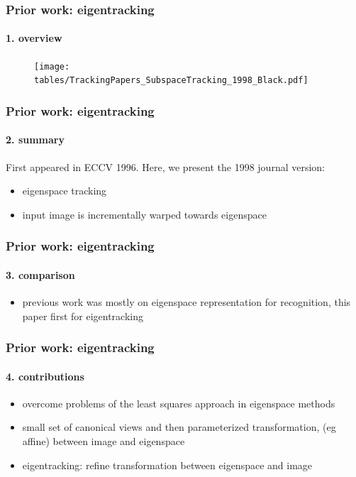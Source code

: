 \begin{frame}
\frametitle{Prior work: eigentracking}
\framesubtitle{1. overview}
\logoCSIPCPL\mypagenum
	\begin{figure}
		\texttt{[image: tables/TrackingPapers\_SubspaceTracking\_1998\_Black.pdf]}
	\end{figure}
\end{frame}



\begin{frame}
\frametitle{Prior work: eigentracking}
\framesubtitle{2. summary}
\logoCSIPCPL\mypagenum
	First appeared in ECCV 1996.  Here, we present the 1998 journal version:\\
	\begin{itemize}
		\item eigenspace tracking			
		\item input image is incrementally warped towards
eigenspace
	\end{itemize}
\end{frame}


\begin{frame}
\frametitle{Prior work: eigentracking}
\framesubtitle{3. comparison}
\logoCSIPCPL\mypagenum		
	\begin{itemize}
		\item previous work was mostly on eigenspace representation for recognition, this paper first for eigentracking
	\end{itemize}
\end{frame}



\begin{frame}
\frametitle{Prior work: eigentracking}
\framesubtitle{4. contributions}
\logoCSIPCPL\mypagenum
	\begin{itemize}
		\item overcome problems of the least squares approach in eigenspace methods
		\item small set of canonical views and then parameterized transformation, (eg affine) between image and eigenspace
		\item eigentracking: refine transformation between eigenspace and image
	\end{itemize}
\end{frame}


